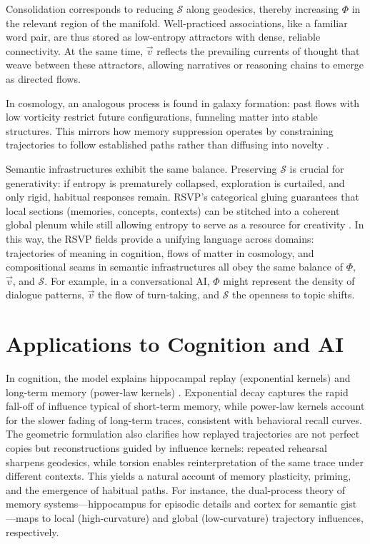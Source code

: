 \documentclass[a4paper,12pt]{article}
\newcommand{\Scal}{\mathcal{S}}
\newcommand{\vvec}{\vec{v}}
\begin{document}
Consolidation corresponds to reducing $\Scal$ along geodesics, thereby increasing $\Phi$ in 
the relevant region of the manifold. Well-practiced associations, like a familiar word pair, 
are thus stored as low-entropy attractors with dense, reliable connectivity. At the same time, 
$\vvec$ reflects the prevailing currents of thought that weave between these attractors, 
allowing narratives or reasoning chains to emerge as directed flows. 

In cosmology, an analogous process is found in galaxy formation: past flows with low vorticity 
restrict future configurations, funneling matter into stable structures. This mirrors how 
memory suppression operates by constraining trajectories to follow established paths rather 
than diffusing into novelty \citep{weinberg2008cosmology}. 

Semantic infrastructures exhibit the same balance. Preserving $\Scal$ is crucial for generativity: 
if entropy is prematurely collapsed, exploration is curtailed, and only rigid, habitual responses 
remain. RSVP’s categorical gluing guarantees that local sections (memories, concepts, contexts) 
can be stitched into a coherent global plenum while still allowing entropy to serve as a resource 
for creativity \citep{lurie2009higher}. In this way, the RSVP fields provide a unifying language 
across domains: trajectories of meaning in cognition, flows of matter in cosmology, and 
compositional seams in semantic infrastructures all obey the same balance of $\Phi$, $\vvec$, 
and $\Scal$. For example, in a conversational AI, $\Phi$ might represent the density of 
dialogue patterns, $\vvec$ the flow of turn-taking, and $\Scal$ the openness to topic shifts.

\section{Applications to Cognition and AI}
In cognition, the model explains hippocampal replay (exponential kernels) and long-term 
memory (power-law kernels) \citep{mcclelland1995why}. Exponential decay captures the 
rapid fall-off of influence typical of short-term memory, while power-law kernels account 
for the slower fading of long-term traces, consistent with behavioral recall curves. The 
geometric formulation also clarifies how replayed trajectories are not perfect copies but 
reconstructions guided by influence kernels: repeated rehearsal sharpens geodesics, while 
torsion enables reinterpretation of the same trace under different contexts. This yields a 
natural account of memory plasticity, priming, and the emergence of habitual paths. For 
instance, the dual-process theory of memory systems—hippocampus for episodic details and 
cortex for semantic gist \citep{squire1992memory}—maps to local (high-curvature) and global 
(low-curvature) trajectory influences, respectively.
\end{document}
